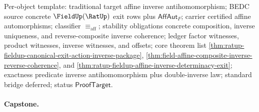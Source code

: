 Per-object template: traditional target affine inverse antihomomorphism; BEDC
source concrete $\FieldUp(\RatUp)$ exit rows plus $\mathsf{AffAut}_F$; carrier
certified affine automorphisms; classifier $\equiv_{\mathrm{aff}}$; stability
obligations concrete composition, inverse uniqueness, and reverse-composite
inverse coherence; ledger factor witnesses, product witnesses, inverse
witnesses, and offsets; core theorem list
\autoref{thm:ratup-fieldup-canonical-exit-action-inverse-package},
\autoref{thm:field-affine-composite-inverse-reverse-coherence}, and
\autoref{thm:ratup-fieldup-affine-inverse-determinacy-exit}; exactness
predicate inverse antihomomorphism plus double-inverse law; standard bridge
deferred; status $\mathsf{ProofTarget}$.

\paragraph{Capstone.}

